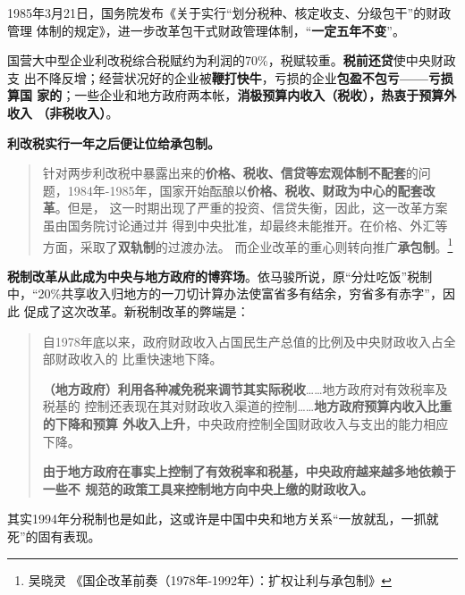 

1985年3月21日，国务院发布《关于实行“划分税种、核定收支、分级包干”的财政管理
体制的规定》，进一步改革包干式财政管理体制，“\textbf{一定五年不变}”。

国营大中型企业利改税综合税赋约为利润的70\%，税赋较重。\textbf{税前还贷}使中央财政支
出不降反增；经营状况好的企业被\textbf{鞭打快牛}，亏损的企业\textbf{包盈不包亏——亏损算国
  家的}；一些企业和地方政府两本帐，\textbf{消极预算内收入（税收），热衷于预算外收入
（非税收入）}。

\textbf{利改税实行一年之后便让位给承包制。}
\begin{quotation}
  针对两步利改税中暴露出来的\textbf{价格、税收、信贷等宏观体制不配套}的问
  题，1984年-1985年，国家开始酝酿以\textbf{价格、税收、财政为中心的配套改革}。但是，
  这一时期出现了严重的投资、信贷失衡，因此，这一改革方案虽由国务院讨论通过并
  得到中央批准，却最终未能推开。在价格、外汇等方面，采取了\textbf{双轨制}的过渡办法。
  而企业改革的重心则转向推广\textbf{承包制}。\footnote{吴晓灵 《国企改革前奏（1978年-1992年）：扩权让利与承包制》}
\end{quotation}


\textbf{税制改革从此成为中央与地方政府的博弈场}。依马骏所说，原“分灶吃饭”税制
中，“20\%共享收入归地方的一刀切计算办法使富省多有结余，穷省多有赤字”，因此
促成了这次改革。新税制改革的弊端是：
\begin{quotation}
  自1978年底以来，政府财政收入占国民生产总值的比例及中央财政收入占全部财政收入的
  比重快速地下降。

  \textbf{（地方政府）利用各种减免税来调节其实际税收}……地方政府对有效税率及税基的
  控制还表现在其对财政收入渠道的控制……\textbf{地方政府预算内收入比重的下降和预算
    外收入上升}，中央政府控制全国财政收入与支出的能力相应下降。

  \textbf{由于地方政府在事实上控制了有效税率和税基，中央政府越来越多地依赖于一些不
    规范的政策工具来控制地方向中央上缴的财政收入。}\cite{majuncaigai}
\end{quotation}

其实1994年分税制也是如此，这或许是中国中央和地方关系“一放就乱，一抓就
  死”的固有表现。


